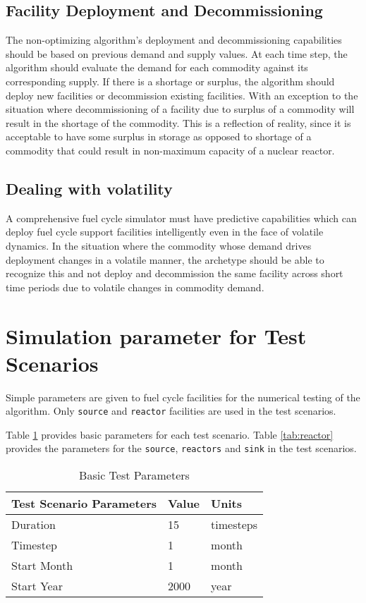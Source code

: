 \documentclass[11pt,letterpaper]{article}
\begin{document}
\subsection{Facility Deployment and Decommissioning }
\label{subesction-deploy}
 The non-optimizing algorithm's deployment and decommissioning capabilities should be based on previous demand and supply values. At each time step, the algorithm should evaluate the demand for each commodity against its corresponding supply. If there is a shortage or surplus, the algorithm should deploy new facilities or decommission existing facilities. With an exception to the situation where decommissioning of a facility due to surplus of a commodity will result in the shortage of the commodity. This is a reflection of reality, since it is acceptable to have some surplus in storage as opposed to shortage of a commodity that could result in non-maximum capacity of a nuclear reactor. 
 
 \subsection{Dealing with volatility}
 \label{subsection-volatile}
A comprehensive fuel cycle simulator must have predictive capabilities which 
can deploy fuel cycle support facilities intelligently even in the face of 
volatile dynamics. In the situation where the commodity whose demand 
drives deployment changes in a volatile manner, the archetype should
be able to recognize this and not deploy and decommission the same facility across
short time periods due to volatile changes in commodity demand. 

\section{Simulation parameter for Test Scenarios}
Simple parameters are given to fuel cycle facilities for the numerical testing of 
the algorithm.  Only \texttt{source} and \texttt{reactor} facilities are used in the test scenarios. 

Table \ref{tab:testscenario} provides basic parameters for each test scenario. Table \ref{tab:reactor} provides the parameters for the \texttt{source}, \texttt{reactors} and \texttt{sink} in the test scenarios.

\begin{table}[H]
	\centering
	\caption {Basic Test Parameters}
	\label{tab:testscenario}
	\begin{tabular}{|l|l|l|}
		\hline
		\textbf{Test Scenario Parameters} & \textbf{Value} & \textbf{Units} \\
		\hline
		Duration & 15 & timesteps \\
		Timestep & 1 & month \\
		Start Month & 1 & month \\
		Start Year & 2000 & year \\
		\hline
	\end{tabular}
\end{table}
\end{document}
